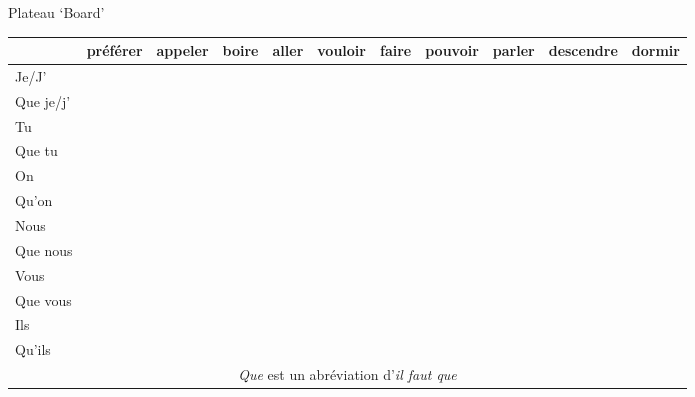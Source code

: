 \documentclass{article}
\date{}
\begin{document}
  \begin{landscape}
  \centering
  \noindent
  {\LARGE
    Plateau `Board'
    \begin{tabular}{| l | c | c | c | c | c | c | c | c | c | c |}
      \hline
                & préférer & appeler & boire & aller & vouloir & faire & pouvoir & parler & descendre & dormir \\
      \hline
      Je/J'     &          &         &       &       &         &       &         &        &           & \\
      \hline
      Que je/j' &          &         &       &       &         &       &         &        &           & \\
      \hline
      Tu        &          &         &       &       &         &       &         &        &           & \\
      \hline
      Que tu    &          &         &       &       &         &       &         &        &           & \\
      \hline
      On        &          &         &       &       &         &       &         &        &           & \\
      \hline
      Qu'on     &          &         &       &       &         &       &         &        &           & \\
      \hline
      Nous      &          &         &       &       &         &       &         &        &           & \\
      \hline
      Que nous  &          &         &       &       &         &       &         &        &           & \\
      \hline
      Vous      &          &         &       &       &         &       &         &        &           & \\
      \hline
      Que vous  &          &         &       &       &         &       &         &        &           & \\
      \hline
      Ils       &          &         &       &       &         &       &         &        &           & \\
      \hline
      Qu'ils    &          &         &       &       &         &       &         &        &           & \\
      \hline
      \multicolumn{11}{c}{\textit{Que} est un abréviation d'\textit{il faut que}}
    \end{tabular}
  }
  \end{landscape}
\end{document}
